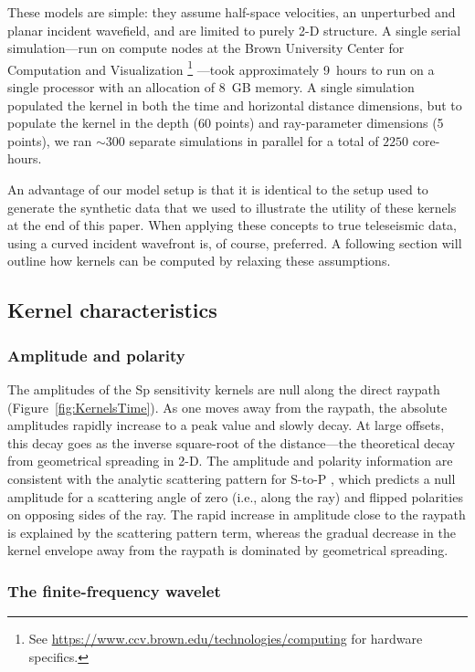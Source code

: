\documentclass[referee]{gji}
\begin{document}
These models are simple: they assume half-space velocities, an unperturbed and planar incident wavefield, and are limited to purely 2-D structure.   A single serial simulation---run on compute nodes at the Brown University Center for Computation and Visualization
\footnote{See \url{https://www.ccv.brown.edu/technologies/computing}
for hardware specifics.}
---took approximately 9~hours to run on a single processor with an allocation of 8~GB memory.
A single simulation populated the kernel in both the time and horizontal distance dimensions, but to populate the kernel in the depth (60 points) and ray-parameter dimensions (5 points), we ran $\sim 300$ separate simulations in parallel for a total of $2250$ core-hours.

An advantage of our model setup is that it is identical to the setup used to generate the synthetic data that we used to illustrate the utility of these kernels at the end of this paper.  When applying these concepts to true teleseismic data, using a curved incident wavefront is, of course, preferred.  A following section will outline how kernels can be computed by relaxing these assumptions.

\subsection{Kernel characteristics}

\subsubsection{Amplitude and polarity}

The amplitudes of the Sp sensitivity kernels are null along the direct raypath (Figure~\ref{fig:KernelsTime}).  As one moves away from the raypath, the absolute amplitudes rapidly increase to a peak value and slowly decay.  At large offsets, this decay goes as the inverse square-root of the distance---the theoretical decay from geometrical spreading in 2-D.  The amplitude and polarity information are consistent with the analytic scattering pattern for S-to-P \citep{Wu1985, Bostock1999, Rondenay2009, Sato2012}, which predicts a null amplitude for a scattering angle of zero (i.e., along the ray) and flipped polarities on opposing sides of the ray.  The rapid increase in amplitude close to the raypath is explained by the scattering pattern term, whereas the gradual decrease in the kernel envelope away from the raypath is dominated by geometrical spreading.

\subsubsection{The finite-frequency wavelet}
\end{document}
